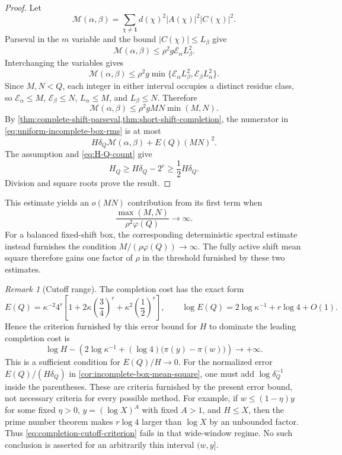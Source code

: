 \documentclass[11pt]{article}
\theoremstyle{definition}
\theoremstyle{remark}
\newtheorem{remark}[theorem]{Remark}
\newcommand{\one}{\mathbf 1}
\newcommand{\cE}{\mathcal E}
\newcommand{\cM}{\mathcal M}
\begin{document}
\begin{proof}
Let
\[
 \cM(\alpha,\beta)
 =\sum_{\chi\ne\one}d(\chi)^2|A(\chi)|^2|C(\chi)|^2.
\]
Parseval in the $m$ variable and the bound $|C(\chi)|\le L_\beta$ give
\[
 \cM(\alpha,\beta)
 \le\rho^2g\cE_\alpha L_\beta^2.
\]
Interchanging the variables gives
\begin{equation}\label{eq:M-upper-bound}
 \cM(\alpha,\beta)
 \le\rho^2g
 \min\{\cE_\alpha L_\beta^2,
       \cE_\beta L_\alpha^2\}.
\end{equation}
Since $M,N<Q$, each integer in either interval occupies a distinct residue class, so $\cE_\alpha\le M$, $\cE_\beta\le N$, $L_\alpha\le M$, and $L_\beta\le N$.  Therefore
\[
 \cM(\alpha,\beta)
 \le\rho^2gMN\min(M,N).
\]
By \cref{thm:complete-shift-parseval,thm:short-shift-completion}, the numerator in \eqref{eq:uniform-incomplete-box-rms} is at most
\[
 H\delta_Q\cM(\alpha,\beta)+E(Q)(MN)^2.
\]
The assumption and \eqref{eq:H-Q-count} give
\[
 H_Q\ge H\delta_Q-2^r\ge\frac12H\delta_Q.
\]
Division and square roots prove the result.
\end{proof}

This estimate yields an $o(MN)$ contribution from its first term when
\begin{equation}\label{eq:average-shift-threshold}
 \frac{\max(M,N)}{\rho^2\varphi(Q)}\longrightarrow\infty.
\end{equation}
For a balanced fixed-shift box, the corresponding deterministic spectral estimate instead furnishes the condition $M/(\rho\varphi(Q))\to\infty$.  The fully active shift mean square therefore gains one factor of $\rho$ in the threshold furnished by these two estimates.

\begin{remark}[Cutoff range]\label{rem:cutoff-range}
The completion cost has the exact form
\[
 E(Q)=\kappa^{-2}4^r
 \left[1+2\kappa\left(\frac34\right)^r
          +\kappa^2\left(\frac12\right)^r\right],
 \qquad
 \log E(Q)=2\log\kappa^{-1}+r\log4+O(1).
\]
Hence the criterion furnished by this error bound for $H$ to dominate the leading completion cost is
\begin{equation}\label{eq:completion-cutoff-criterion}
 \log H-
 \left(2\log\kappa^{-1}
       +(\log4)\bigl(\pi(y)-\pi(w)\bigr)\right)
 \longrightarrow+\infty.
\end{equation}
This is a sufficient condition for $E(Q)/H\to0$.  For the normalized error $E(Q)/(H\delta_Q)$ in \cref{cor:incomplete-box-mean-square}, one must add $\log\delta_Q^{-1}$ inside the parentheses.  These are criteria furnished by the present error bound, not necessary criteria for every possible method.  For example, if $w\le(1-\eta)y$ for some fixed $\eta>0$, $y=(\log X)^A$ with fixed $A>1$, and $H\le X$, then the prime number theorem makes $r\log4$ larger than $\log X$ by an unbounded factor.  Thus \eqref{eq:completion-cutoff-criterion} fails in that wide-window regime.  No such conclusion is asserted for an arbitrarily thin interval $(w,y]$.
\end{remark}
\end{document}
